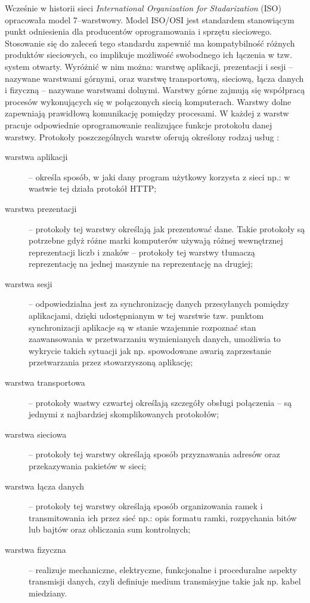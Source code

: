 Wcześnie w historii sieci \emph{International Organization for Stadarization} (ISO) opracowała model 7--warstwowy.
Model ISO/OSI jest standardem stanowiącym punkt odniesienia dla producentów oprogramowania i sprzętu sieciowego. 
Stosowanie się do zaleceń tego standardu zapewnić ma kompatybilność różnych produktów sieciowych, co implikuje 
możliwość swobodnego ich łączenia w tzw. system otwarty.
Wyróżnić w nim można: warstwę aplikacji, prezentacji i sesji -- nazywane warstwami górnymi, oraz
warstwę transportową, sieciową, łącza danych i fizyczną -- nazywane warstwami dolnymi. Warstwy górne zajmują się 
współpracą procesów wykonujących się w połączonych siecią komputerach. Warstwy dolne zapewniają prawidłową 
komunikację pomiędzy procesami. W każdej z warstw pracuje odpowiednie oprogramowanie realizujące funkcje 
protokołu danej warstwy. Protokoły poszczególnych warstw oferują określony rodzaj usług \cite{siecikomputerowe}:
\begin{description}
\item[warstwa aplikacji] -- określa sposób, w jaki dany program użytkowy korzysta z sieci np.: w wastwie tej działa protokół 
HTTP;
\item[warstwa prezentacji] -- protokoły tej warstwy określają jak prezentować dane. Takie protokoły są potrzebne gdyż różne
marki komputerów używają różnej wewnętrznej reprezentacji liczb i znaków -- protokoły tej warstwy tłumaczą reprezentację
na jednej maszynie na reprezentację na drugiej;
\item[warstwa sesji] -- odpowiedzialna jest za synchronizację danych przesyłanych pomiędzy aplikacjami, dzięki 
udostępnianym w tej warstwie tzw. punktom synchronizacji aplikacje są w stanie wzajemnie rozpoznać stan 
zaawansowania w przetwarzaniu wymienianych danych, umożliwia to wykrycie takich sytuacji jak np. spowodowane 
awarią zaprzestanie przetwarzania przez stowarzyszoną aplikację;
\item[warstwa transportowa] -- protokoły wastwy czwartej określają szczegóły obsługi połączenia -- są jednymi z najbardziej
skomplikowanych protokołów;
\item[warstwa sieciowa] --  protokoły tej warstwy określają sposób przyznawania adresów oraz przekazywania pakietów w sieci;
\item[warstwa łącza danych] -- protokoły tej warstwy określają sposób organizowania ramek i transmitowania ich przez sieć np.:
opis formatu ramki, rozpychania bitów lub bajtów oraz obliczania sum kontrolnych;
\item[warstwa  fizyczna] -- realizuje mechaniczne, elektryczne, funkcjonalne i proceduralne aspekty transmisji 
danych, czyli definiuje medium transmisyjne takie jak np. kabel miedziany.
\end{description}

